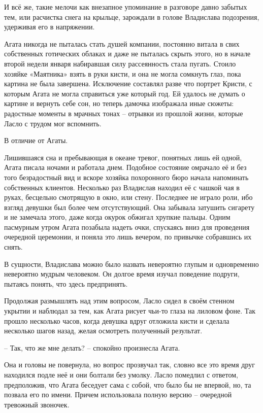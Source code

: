 \documentclass[
  a5paperpaper,
  DIV=11,
  numbers=noendperiod]{scrreprt}
\begin{document}
И всё же, такие мелочи как внезапное упоминание в разговоре давно
забытых тем, или расчистка снега на крыльце, зарождали в голове
Владислава подозрения, удерживая его в напряжении.

Агата никогда не пыталась стать душей компании, постоянно витала в свих
собственных готических облаках и даже не пыталась скрыть этого, но в
начале второй недели января набиравшая силу рассеянность стала пугать.
Стоило хозяйке «Маятника» взять в руки кисти, и она не могла сомкнуть
глаз, пока картина не была завершена. Исключение составлял разве что
портрет Кристи, с которым Агата не могла справиться уже который год. Ей
удалось не думать о картине и вернуть себе сон, но теперь дамочка
изображала иные сюжеты: радостные моменты в мрачных тонах -- отрывки из
прошлой жизни, которые Ласло с трудом мог вспомнить.

В отличие от Агаты.

Лишившаяся сна и пребывающая в океане тревог, понятных лишь ей одной,
Агата писала ночами и работала днем. Подобное состояние омрачало её и
без того безрадостный вид и вскоре хозяйка похоронного бюро начала
напоминать собственных клиентов. Несколько раз Владислав находил её с
чашкой чая в руках, бесцельно смотрящую в окно, или стену. Последнее не
играло роли, ибо взгляд девушки был более чем отсутствующий. Она
забывала затушить сигарету и не замечала этого, даже когда окурок
обжигал хрупкие пальцы. Одним пасмурным утром Агата позабыла надеть
очки, спускаясь вниз для проведения очередной церемонии, и поняла это
лишь вечером, по привычке собравшись их снять.

В сущности, Владислава можно было назвать невероятно глупым и
одновременно невероятно мудрым человеком. Он долгое время изучал
поведение подруги, пытаясь понять, что здесь предпринять.

Продолжая размышлять над этим вопросом, Ласло сидел в своём стенном
укрытии и наблюдал за тем, как Агата рисует чьи-то глаза на лиловом
фоне. Так прошло несколько часов, когда девушка вдруг отложила кисти и
сделала несколько шагов назад, желая осмотреть полученный результат.

-- Так, что же мне делать? -- спокойно произнесла Агата.

Она и головы не повернула, но вопрос прозвучал так, словно все это время
друг находился подле неё и они болтали без умолку. Ласло помедлил с
ответом, предположив, что Агата беседует сама с собой, что было бы не
впервой, но, та позвала его по имени. Причем использовала полную версию
-- очередной тревожный звоночек.
\end{document}
